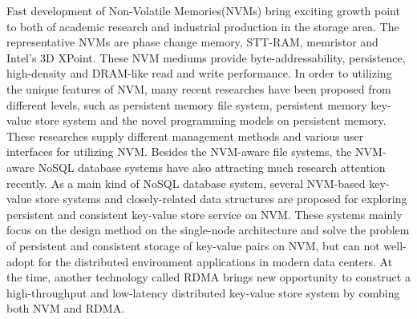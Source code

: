 \documentclass[format=acmsmall, review=false, screen=true]{acmart}
\begin{document}
	Fast development of Non-Volatile Memories(NVMs) bring exciting growth point to both of academic research and industrial production in the storage area. The representative NVMs are phase change memory\cite{Wong2010Phase}, STT-RAM\cite{Wang2013Low}, memristor\cite{Zangeneh2014Design} and Intel's 3D XPoint\cite{3dxpoint}. These NVM mediums provide byte-addressability, persistence, high-density and DRAM-like read and write performance. In order to utilizing the unique features of NVM, many recent researches have been proposed from different levels, such as persistent memory file system\cite{dulloor2014system,Zheng2017HMVFS,Volos2013Storage,condit2009better,wu2011scmfs,Ou2016A}, persistent memory key-value store system\cite{203265} and the novel programming models\cite{Hwang2015HEAPO,volos2011mnemosyne,zhang2015mojim} on persistent memory. These researches supply different management methods and various user interfaces for utilizing NVM. Besides the NVM-aware file systems, the NVM-aware NoSQL database systems have also attracting much research attention recently. As a main kind of NoSQL database system, several NVM-based key-value store systems and closely-related data structures\cite{echo,203265,Wu2016NVMcached,Oukid2016FPTree,nv-tree} are proposed for exploring persistent and consistent key-value store service on NVM. These systems mainly focus on the design method on the single-node architecture and solve the problem of persistent and consistent storage of key-value pairs on NVM, but can not well-adopt for the distributed environment applications in modern data centers. At the time, another technology called RDMA brings new opportunity to construct a high-throughput and low-latency distributed key-value store system by combing both NVM and RDMA.
\end{document}
